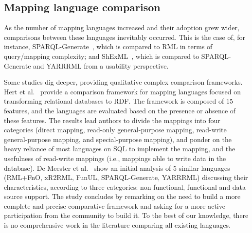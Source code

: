 \subsection{Mapping language comparison}
As the number of mapping languages increased and their adoption grew wider, comparisons between these languages inevitably occurred. This is the case of, for instance, SPARQL-Generate~\cite{Lefrancois2017sparqlgenerate}, which is compared to RML in terms of query/mapping complexity; and ShExML~\cite{Garcia-Gonzalez2020shexml}, which is compared to SPARQL-Generate and YARRRML from a usability perspective.

Some studies dig deeper, providing qualitative complex comparison frameworks. Hert et al.~\cite{hert2011comparison} provide a comparison framework for mapping languages focused on transforming relational databases to RDF. The framework is composed of 15 features, and the languages are evaluated based on the presence or absence of these features.%
The results lead authors to divide the mappings into four categories (direct mapping, read-only general-purpose mapping, read-write general-purpose mapping, and special-purpose mapping), and ponder on the heavy reliance of most languages on SQL to implement the mapping, and the usefulness of read-write mappings (i.e., mappings able to write data in the database). De Meester et al.~\cite{DeMeester2019comparison} show an initial analysis of 5 similar languages (RML+FnO, xR2RML, FunUL, SPARQL-Generate, YARRRML) discussing their characteristics, according to three categories: non-functional, functional and data source support. The study concludes by remarking on the need to build a more complete and precise comparative framework and asking for a more active participation from the community to build it. To the best of our knowledge, there is no comprehensive work in the literature comparing all existing languages.  
